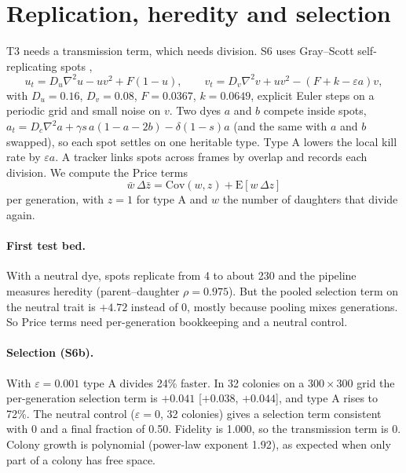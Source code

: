 \documentclass[11pt]{article}
\begin{document}
\section{Replication, heredity and selection}
\label{sec:spots}
T3 needs a transmission term, which needs division. S6 uses Gray--Scott self-replicating spots \cite{Pearson93},
\begin{equation}
  u_t = D_u\nabla^2 u - uv^2 + F(1-u), \qquad v_t = D_v\nabla^2 v + uv^2 - (F + k - \varepsilon a)v ,
\end{equation}
with $D_u = 0.16$, $D_v = 0.08$, $F = 0.0367$, $k = 0.0649$, explicit Euler steps on a periodic grid and small noise on
$v$. Two dyes $a$ and $b$ compete inside spots, $a_t = D_c\nabla^2 a + \gamma s\,a(1-a-2b) - \delta(1-s)a$ (and the
same with $a$ and $b$ swapped), so each spot settles on one heritable type. Type A lowers the local kill rate by
$\varepsilon a$. A tracker links spots across frames by overlap and records each division. We compute the Price terms
\cite{Price70,Frank95}
\begin{equation}
  \bar w\,\Delta\bar z = \mathrm{Cov}(w, z) + \mathrm{E}[w\,\Delta z]
\end{equation}
per generation, with $z = 1$ for type A and $w$ the number of daughters that divide again.

\paragraph{First test bed.} With a neutral dye, spots replicate from 4 to about 230 and the pipeline measures
heredity (parent--daughter $\rho = 0.975$). But the pooled selection term on the neutral trait is $+4.72$ instead of 0,
mostly because pooling mixes generations. So Price terms need per-generation bookkeeping and a neutral control.

\paragraph{Selection (S6b).} With $\varepsilon = 0.001$ type A divides 24\% faster. In 32 colonies on a $300\times300$
grid the per-generation selection term is $+0.041$ [$+0.038$, $+0.044$], and type A rises to 72\%. The neutral control
($\varepsilon=0$, 32 colonies) gives a selection term consistent with 0 and a final fraction of 0.50. Fidelity is 1.000,
so the transmission term is 0. Colony growth is polynomial (power-law exponent 1.92), as expected when only part of
a colony has free space.
\end{document}
